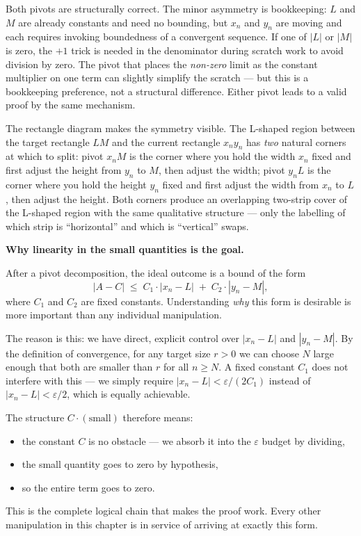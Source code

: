\begin{remark*}
Both pivots are structurally correct.
The minor asymmetry is bookkeeping: $L$ and $M$ are already constants
and need no bounding, but $x_n$ and $y_n$ are moving and each requires
invoking boundedness of a convergent sequence.
If one of $|L|$ or $|M|$ is zero, the $+1$ trick is needed in the
denominator during scratch work to avoid division by zero.
The pivot that places the \emph{non-zero} limit as the constant
multiplier on one term can slightly simplify the scratch — but this
is a bookkeeping preference, not a structural difference.
Either pivot leads to a valid proof by the same mechanism.
\end{remark*}

\begin{remark*}
The rectangle diagram makes the symmetry visible.
The L-shaped region between the target rectangle $LM$ and the current
rectangle $x_n y_n$ has \emph{two} natural corners at which to split:
pivot $x_n M$ is the corner where you hold the width $x_n$ fixed and
first adjust the height from $y_n$ to $M$, then adjust the width;
pivot $y_n L$ is the corner where you hold the height $y_n$ fixed and
first adjust the width from $x_n$ to $L$, then adjust the height.
Both corners produce an overlapping two-strip cover of the L-shaped
region with the same qualitative structure — only the labelling of
which strip is ``horizontal'' and which is ``vertical'' swaps.
\end{remark*}

\medskip

\noindent\textbf{Why linearity in the small quantities is the goal.}

After a pivot decomposition, the ideal outcome is a bound of the form
\[
  |A - C| \;\le\; C_1 \cdot |x_n - L| \;+\; C_2 \cdot |y_n - M|,
\]
where $C_1$ and $C_2$ are fixed constants.
Understanding \emph{why} this form is desirable is more important than
any individual manipulation.

The reason is this: we have direct, explicit control over $|x_n - L|$
and $|y_n - M|$.
By the definition of convergence, for any target size $r > 0$ we can
choose $N$ large enough that both are smaller than $r$ for all $n \ge N$.
A fixed constant $C_1$ does not interfere with this — we simply require
$|x_n - L| < \varepsilon / (2C_1)$ instead of $|x_n - L| < \varepsilon/2$,
which is equally achievable.

The structure $C \cdot (\text{small})$ therefore means:
\begin{itemize}
  \item the constant $C$ is no obstacle — we absorb it into the
        $\varepsilon$ budget by dividing,
  \item the small quantity goes to zero by hypothesis,
  \item so the entire term goes to zero.
\end{itemize}
This is the complete logical chain that makes the proof work.
Every other manipulation in this chapter is in service of arriving
at exactly this form.

